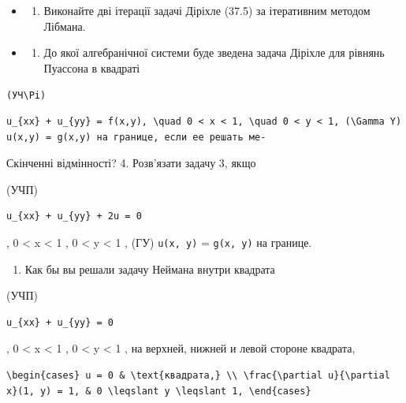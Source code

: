 \documentclass[
  ukrainian,
]{article}
\providecommand{\tightlist}{%
  \setlength{\itemsep}{0pt}\setlength{\parskip}{0pt}}
\begin{document}
\begin{itemize}
\tightlist
\item
  \begin{enumerate}
  \def\labelenumi{\arabic{enumi}.}
  \setcounter{enumi}{1}
  \tightlist
  \item
    Виконайте дві ітерації задачі Діріхле (37.5) за ітеративним методом
    Лібмана.
  \end{enumerate}
\item
  \begin{enumerate}
  \def\labelenumi{\arabic{enumi}.}
  \setcounter{enumi}{2}
  \tightlist
  \item
    До якої алгебранічної системи буде зведена задача Діріхле для
    рівнянь Пуассона в квадраті
  \end{enumerate}
\end{itemize}

\texttt{(УЧ\textbackslash{}Pi)}

\begin{verbatim}
u_{xx} + u_{yy} = f(x,y), \quad 0 < x < 1, \quad 0 < y < 1, (\Gamma Y) u(x,y) = g(x,y) на границе, если ее решать ме-
\end{verbatim}

Скінченні відмінності? 4. Розв'язати задачу 3, якщо

(УЧП)

\begin{verbatim}
u_{xx} + u_{yy} + 2u = 0
\end{verbatim}

, 0 \textless{} x \textless{} 1 , 0 \textless{} y \textless{} 1 , (ГУ)
\texttt{u(x,\ y)} = \texttt{g(x,\ y)} на границе.

\begin{enumerate}
\def\labelenumi{\arabic{enumi}.}
\setcounter{enumi}{4}
\tightlist
\item
  Как бы вы решали задачу Неймана внутри квадрата
\end{enumerate}

(УЧП)

\begin{verbatim}
u_{xx} + u_{yy} = 0
\end{verbatim}

, 0 \textless{} x \textless{} 1 , 0 \textless{} y \textless{} 1 , на
верхней, нижней и левой стороне квадрата,

\begin{verbatim}
\begin{cases} u = 0 & \text{квадрата,} \\ \frac{\partial u}{\partial x}(1, y) = 1, & 0 \leqslant y \leqslant 1, \end{cases}
\end{verbatim}
\end{document}

